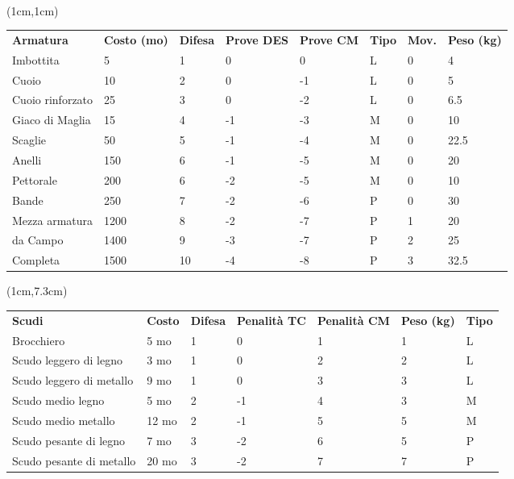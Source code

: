 \documentclass[a4paper,12 pt,openany]{book}
\begin{document}
		~\newpage
		

	\begin{textblock*}{19cm}(1cm,1cm) %

		\begin{tabular}{llllllll}

			\textbf{Armatura} & \textbf{Costo (mo)} & \textbf{Difesa} & \textbf{Prove DES} & \textbf{Prove CM} & \textbf{Tipo} & \textbf{Mov.} & \textbf{Peso (kg)}\\
			Imbottita   		& 5    & 1   & 0  	 & 0  & L   & 0   & 4\\
			Cuoio   			& 10   & 2   & 0   & -1 & L   & 0   & 5\\
			Cuoio rinforzato   	& 25  &3  & 0   & -2 & L   & 0   & 6.5\\
			Giaco di Maglia   	& 15   & 4  & -1  & -3 & M   & 0   & 10\\
			Scaglie				& 50   & 5  & -1  & -4 & M   & 0   & 22.5\\
			Anelli 				& 150  & 6  & -1  & -5 & M   & 0   & 20\\
			Pettorale    		& 200  & 6  & -2  & -5 & M   & 0   & 10\\
			Bande   			& 250  & 7  & -2  & -6 & P   & 0   & 30\\
			Mezza armatura   	& 1200 & 8  & -2  & -7 & P   & 1   & 20\\
			da Campo			& 1400 & 9 & -3  & -7 & P   & 2   & 25\\
			Completa			& 1500 & 10  & -4  & -8 & P   & 3   & 32.5\\
		\end{tabular}
		
\end{textblock*}

		\begin{textblock*}{19cm}(1cm,7.3cm) %
	
	\begin{tabular}{lllllll}

		\textbf{Scudi} & \textbf{Costo} & \textbf{Difesa} & \textbf{Penalità TC} & \textbf{Penalità CM} & \textbf{Peso (kg)} & \textbf{Tipo}\\
		Brocchiero					& 5 mo  	& 1 & 0		& 1& 1  & L\\
		Scudo leggero di legno   	& 3 mo  	& 1 & 0		& 2& 2  & L\\
		Scudo leggero di metallo 	& 9  mo  	& 1 & 0		& 3& 3  & L\\
		Scudo medio legno   		& 5 mo   	& 2 & -1	& 4& 3  & M\\
		Scudo medio metallo 		& 12 mo  	& 2 & -1  	& 5& 5  & M\\
		Scudo pesante di legno   	& 7  mo  	& 3 & -2    & 6& 5  & P\\
		Scudo pesante di metallo 	& 20 mo  	& 3 & -2    & 7& 7  & P\\
	\end{tabular}
\end{textblock*}
\end{document}
